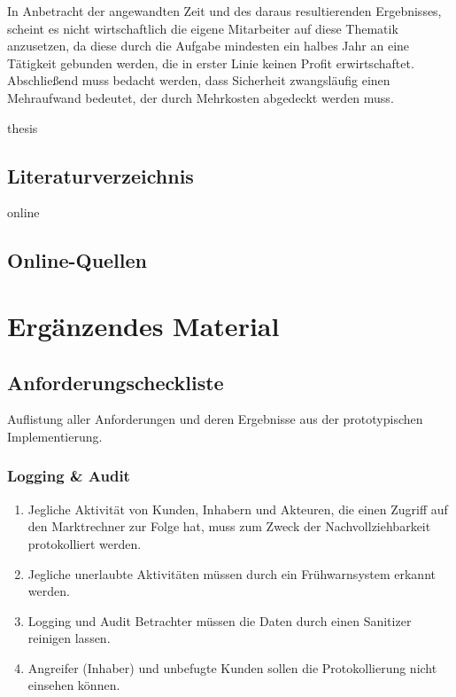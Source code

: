 \documentclass[11pt,a4paper]{report}
\begin{document}
In Anbetracht der angewandten Zeit und des daraus resultierenden Ergebnisses, scheint es nicht wirtschaftlich die eigene Mitarbeiter auf diese Thematik anzusetzen, da diese durch die Aufgabe mindesten ein halbes Jahr an eine Tätigkeit gebunden werden, die in erster Linie keinen Profit erwirtschaftet. Abschließend muss bedacht werden, dass Sicherheit zwangsläufig einen Mehraufwand bedeutet, der durch Mehrkosten abgedeckt werden muss.

\newpage


\begin{btSect}{thesis} %
\section*{Literaturverzeichnis}
\btPrintCited
\end{btSect}
\begin{btSect}{online}
\section*{Online-Quellen}
\btPrintCited
\end{btSect}

\appendix

\chapter{Ergänzendes Material}

\section{Anforderungscheckliste}

Auflistung aller Anforderungen und deren Ergebnisse aus der prototypischen Implementierung.

\subsection{Logging \& Audit}

\begin{enumerate}
\item[\Square] Jegliche Aktivität von Kunden, Inhabern und Akteuren, die einen Zugriff auf den Marktrechner zur Folge hat, muss zum Zweck der Nachvollziehbarkeit protokolliert werden.
\item[\Square] Jegliche unerlaubte Aktivitäten müssen durch ein Frühwarnsystem erkannt werden. 
\item[\Square] Logging und Audit Betrachter müssen die Daten durch einen Sanitizer reinigen lassen. 
\item[\Square] Angreifer (Inhaber) und unbefugte Kunden sollen die Protokollierung nicht einsehen können.
\end{enumerate}
\end{document}
